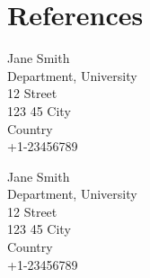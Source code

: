 \documentclass{karencv}
\begin{document}
\section{References}
\begin{reflist}
\item Jane Smith \\
Department, University\\
12 Street \\
123 45 City\\
Country\\
+1-23456789\\
\item Jane Smith \\
Department, University\\
12 Street \\
123 45 City\\
Country\\
+1-23456789\\
\end{reflist}
\end{document}
